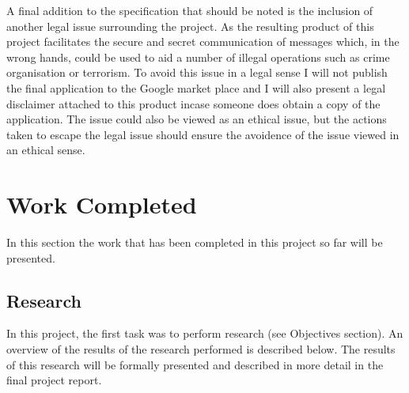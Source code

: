\documentclass[a4paper,11pt]{article}
\begin{document}
A final addition to the specification that should be noted is the inclusion of another legal issue surrounding the project. As the resulting product of this project facilitates the secure and secret communication of messages which, in the wrong hands, could be used to aid a number of illegal operations such as crime organisation or terrorism. To avoid this issue in a legal sense I will not publish the final application to the Google market place and I will also present a legal disclaimer attached to this product incase someone does obtain a copy of the application. The issue could also be viewed as an ethical issue, but the actions taken to escape the legal issue should ensure the avoidence of the issue viewed in an ethical sense. 

\section{Work Completed}

In this section the work that has been completed in this project so far will be presented.

\subsection{Research}

In this project, the first task was to perform research (see Objectives section). An overview of the results of the research performed is described below. The results of this research will be formally presented and described in more detail in the final project report.
\end{document}
